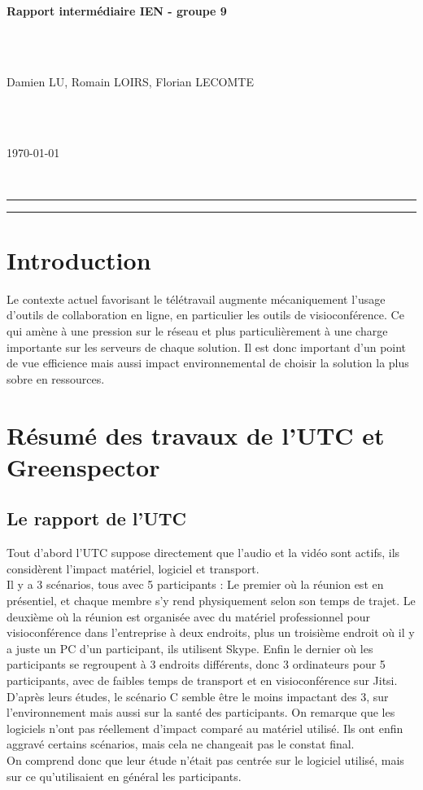 \documentclass[11pt,a4paper]{article}
\begin{document}
\begin{huge}
\noindent \textbf{Rapport intermédiaire IEN - groupe 9}
\end{huge} 
\\ \\
\begin{Large}
Damien LU, Romain LOIRS, Florian LECOMTE
\end{Large} \\ \\
\begin{Large}
\today
\end{Large}
~\\
\hrule 
{}
\tableofcontents
\hrule
\section{Introduction}
Le contexte actuel favorisant le télétravail augmente mécaniquement l’usage d’outils de collaboration en ligne, en particulier les outils de visioconférence. Ce qui amène à une pression sur le réseau et plus particulièrement à une charge importante sur les serveurs de chaque solution. Il est donc important d’un point de vue efficience mais aussi impact environnemental de choisir la solution la plus sobre en ressources.
\section{Résumé des travaux de l'UTC et Greenspector}
\subsection{Le rapport de l'UTC}
Tout d'abord l'UTC suppose directement que l'audio et la vidéo sont actifs, ils considèrent l'impact matériel, logiciel et transport.\\
Il y a 3 scénarios, tous avec 5 participants : Le premier où la réunion est en présentiel, et chaque membre s'y rend physiquement selon son temps de trajet. Le deuxième où la réunion est organisée avec du matériel professionnel pour visioconférence dans l'entreprise à deux endroits, plus un troisième endroit où il y a juste un PC d'un participant, ils utilisent Skype. Enfin le dernier où les participants se regroupent à 3 endroits différents, donc 3 ordinateurs pour 5 participants, avec de faibles temps de transport et en visioconférence sur Jitsi.\\
D'après leurs études, le scénario C semble être le moins impactant des 3, sur l'environnement mais aussi sur la santé des participants. On remarque que les logiciels n'ont pas réellement d'impact comparé au matériel utilisé. Ils ont enfin aggravé certains scénarios, mais cela ne changeait pas le constat final.\\
On comprend donc que leur étude n'était pas centrée sur le logiciel utilisé, mais sur ce qu'utilisaient en général les participants.
\end{document}
